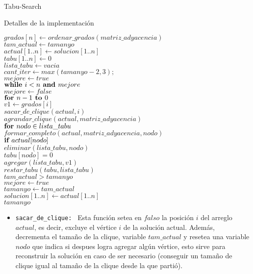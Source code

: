 \begin{section}{Tabu-Search}
\begin{subsection}{Detalles de la implementación}
			\begin{pseudo}
				\tab $grados[n] \leftarrow ordenar\_grados(matriz\_adyacencia)$\\
				\tab $tam\_actual \leftarrow tamanyo$\\
				\tab $actual[1..n] \leftarrow solucion[1..n]$\\
				\tab $tabu[1..n] \leftarrow 0$\\
				\tab $lista\_tabu \leftarrow vacia$\\
				\tab $cant\_iter \leftarrow max(tamanyo-2,3);$\\
				\tab $mejore \leftarrow true$\\
				\tab $\textbf{while } i<n \textbf{ and } mejore$\\
				\tab \tab \tab $mejore \leftarrow false$\\
				\tab \tab \tab $\textbf{for } n-1 \textbf{ to } 0$\\
				\tab \tab \tab \tab $v1 \leftarrow grados[i]$\\
				\tab \tab \tab \tab $sacar\_de\_clique(actual,i)$\\
				\tab \tab \tab \tab $agrandar\_clique(actual,matriz\_adyacencia)$\\
				\tab \tab \tab $\textbf{for } nodo \in lista\_tabu$\\
				\tab \tab \tab \tab $formar\_completo(actual,matriz\_adyacencia,nodo)$\\
				\tab \tab \tab \tab $\textbf{if } actual[nodo]$\\
				\tab \tab \tab \tab \tab $eliminar(lista\_tabu,nodo)$\\
				\tab \tab \tab \tab \tab $tabu[nodo]=0$\\
				\tab $agregar(lista\_tabu, v1)$\\
				\tab $restar\_tabu(tabu,lista\_tabu)$\\
				\tab \tab \tab \IF $tam\_actual>tamanyo$\\
				\tab \tab \tab \tab $mejore \leftarrow true$\\
				\tab \tab \tab \tab $tamanyo \leftarrow tam\_actual$\\
				\tab \tab \tab \tab $solucion[1..n] \leftarrow actual[1..n]$\\
				\RET $tamanyo$\\
			\end{pseudo}

		\begin{itemize}
			\item \texttt{sacar\_de\_clique: } Esta función setea en $falso$ la posición $i$ del arreglo $actual$, es decir, excluye el vértice $i$ de la solución actual. Además, decrementa el tamaño de la clique, variable $tam\_actual$ y resetea una variable $nodo$ que indica si despues logra agregar algún vértice, esto sirve para reconstruir la solución en caso de ser necesario (conseguir un tamaño de clique igual al tamaño de la clique desde la que partió).
			

\end{itemize}
\end{subsection}
\end{section}
